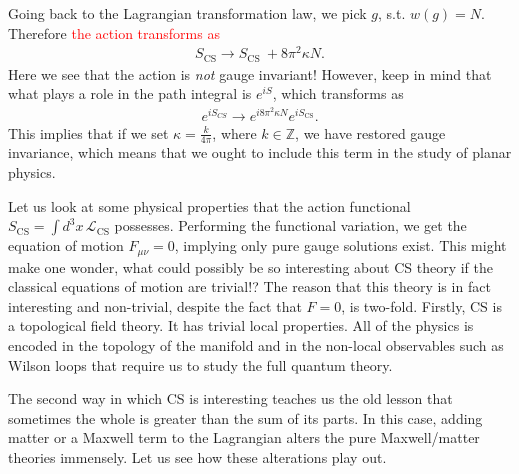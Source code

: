     Going back to the Lagrangian transformation law, we pick $g$, s.t. $w(g)=N$. Therefore \textcolor{red}{the action transforms as}
    \begin{align}
        S_{\text{CS}} \rightarrow S_{\text{CS } }+ 8 \pi^2 \kappa N.
    \end{align}
    Here we see that the action is \textit{not} gauge invariant! However, keep in mind that what plays a role in the path integral is $e^{i S}$, which transforms as
    \begin{align}
        e^{i S_{CS}} \rightarrow e^{i 8 \pi^2 \kappa N} e^{i S_{\text{CS}}}.
    \end{align}
    This implies that if we set $\kappa = \frac{k}{4 \pi}$, where $k\in \mathbb{Z}$, we have restored gauge invariance, which means that we ought to include this term in the study of planar physics.

    Let us look at some physical properties that the action functional $S_{\text{CS}} = \int d^3x \, \mathcal{L}_{\text{CS}}$ possesses. Performing the functional variation, we get the equation of motion $F_{\mu \nu}=0$, implying only pure gauge solutions exist. This might make one wonder, what could possibly be so interesting about CS theory if the classical equations of motion are trivial!?
    The reason that this theory is in fact interesting and non-trivial, despite the fact that $F=0$, is two-fold. Firstly, CS is a topological field theory. It has trivial local properties. All of the physics is encoded in the topology of the manifold and in the non-local observables such as Wilson loops that require us to study the full quantum theory.

    The second way in which CS is interesting teaches us the old lesson that sometimes the whole is greater than the sum of its parts. In this case, adding matter or a Maxwell term to the Lagrangian alters the pure Maxwell/matter theories immensely. Let us see how these alterations play out.


